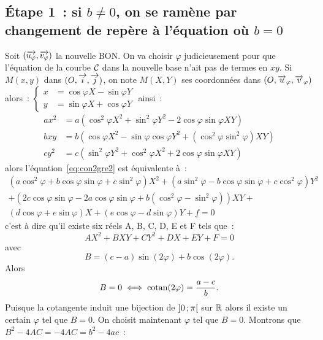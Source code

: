 \subsection{Étape 1~: si \(b\neq 0\), on se ramène par changement de repère à
l'équation où \(b = 0\)}
Soit \((\overrightarrow{u_{\varphi}},\overrightarrow{v_{\varphi}})\) la nouvelle BON\@. On va
choisir \(\varphi\) judicieusement pour que l'équation de la courbe
\(\mathcal{C}_{{}}\) dans la nouvelle base n'ait pas de termes en \(xy\). Si
\(M(x, y)\) dans \((O,\overrightarrow{i},\overrightarrow{j})\), on note \(M(X, Y)\) ses coordonnées dans
\((O, \overrightarrow{u}_\varphi, \overrightarrow{v}_\varphi)\) alors~:
\(\begin{cases} x& = \cos\varphi X - \sin\varphi Y \\ y& = \sin\varphi X +
\cos\varphi Y\end{cases}\) ainsi~:
\begin{align}
  ax^2& = a(\cos^2\varphi X^2 + \sin^2\varphi Y^2 - 2\cos\varphi\sin\varphi
  XY)\\
  bxy& = b(\cos\varphi X^2 -\sin\varphi\cos\varphi Y^2 + (\cos^2\varphi
  \sin^2\varphi)XY)\\
  cy^2& = c(\sin^2\varphi Y^2 + \cos^2\varphi X^2 + 2\cos\varphi\sin\varphi XY)
\end{align}
alors l'équation~\eqref{eq:con2gre2} est équivalente à~:
\begin{multline}
  (a\cos^2\varphi + b\cos\varphi\sin\varphi
  +c\sin^2\varphi)X^2 + (a\sin^2\varphi - b\cos\varphi\sin\varphi
  +c\cos^2\varphi)Y^2\\ + (2c\cos\varphi\sin\varphi-2a\cos\varphi\sin\varphi + b(\cos^2\varphi
  - \sin^2\varphi))XY + \\ (d\cos\varphi + e\sin\varphi)X +(e\cos\varphi -
  d\sin\varphi)Y +f = 0
\end{multline}
c'est à dire qu'il existe six réels A, B, C, D, E et F tels que~:
\begin{equation}
  AX^2 + BXY + CY^2 + DX + EY + F = 0 \label{eq:eqz}
\end{equation}
avec
\begin{equation}
  B = (c-a)\sin(2\varphi) + b\cos(2\varphi).
\end{equation}
Alors
\begin{equation}
  B = 0 \iff \operatorname{cotan}(2\varphi) = \frac{a-c}{b}.
\end{equation}
Puisque la cotangente induit une bijection de \(\left] 0 \, ; {} \pi \right[\) sur
\(\mathbb{R}\) alors il existe un certain \(\varphi\) tel que \(B = 0\). On choisit
maintenant \(\varphi\) tel que \(B = 0\). Montrons que
\(B^2-4AC = -4AC = b^2-4ac\)~:
